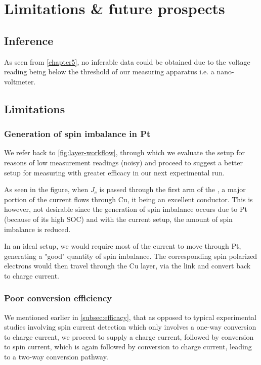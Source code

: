 \chapter{Limitations \& future prospects}

\label{chapter6}

\section{Inference}

As seen from \cref{chapter5}, no inferable data could be obtained due to the voltage reading being below the threshold of our measuring apparatus i.e. a nano-voltmeter.

\section{Limitations}


\subsection{Generation of spin imbalance in Pt}

We refer back to \cref{fig:layer-workflow}, through which we evaluate the setup for reasons of low measurement readings (noisy) and proceed to suggest a better setup for measuring with greater efficacy in our next experimental run.

As seen in the figure, when \( J_c \) is passed through the first arm of the \Hst, a major portion of the current flows through Cu, it being an excellent conductor.
This is however, not desirable since the generation of spin imbalance occurs due to Pt (because of its high SOC) and with the current setup, the amount of spin imbalance is reduced.

In an ideal setup, we would require most of the current to move through Pt, generating a "good" quantity of spin imbalance.
The corresponding spin polarized electrons would then travel through the Cu layer, via the link and convert back to charge current.


\subsection{Poor conversion efficiency}

We mentioned earlier in \cref{subsec:efficacy}, that as opposed to typical experimental studies involving spin current detection which only involves a one-way conversion to charge current, we proceed to supply a charge current, followed by conversion to spin current, which is again followed by conversion to charge current, leading to a two-way conversion pathway.

